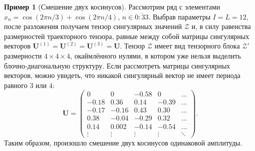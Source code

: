 \documentclass[specialist,
    substylefile = spbu_report.rtx,
    subf,href,colorlinks=true, 12pt]{disser}
\theoremstyle{plain}
\theoremstyle{definition}
\newtheorem{example}{Пример}[section]
\theoremstyle{remark}
\begin{document}
    \begin{example}[Смешение двух косинусов]
        Рассмотрим ряд с элементами $x_n=\cos(2\pi n/3) + \cos(2\pi n/4)$, $n\in\overline{0:33}$.
        Выбрав параметры $I=L=12$, после разложения получаем тензор сингулярных значений $\mathcal{Z}$ и, в силу равенства размерностей
        траекторного тензора, равные между собой матрицы сингулярных векторов $\mathbf{U}^{(1)}=\mathbf{U}^{(2)}=\mathbf{U}^{(3)}=\mathbf{U}$.
        Тензор $\mathcal{Z}$ имеет вид тензорного блока $\mathcal{Z}'$ размерности $4\times 4\times 4$, окаймлённого нулями, в
        котором уже нельзя выделить блочно-диагональную структуру.
        Если рассмотреть матрицы сингулярных векторов, можно увидеть, что никакой сингулярный вектор не имеет периода равного $3$ или $4$:
        \[
            \mathbf{U}=
            \begin{pmatrix}
                0      & 0      & -0.58  & 0      & \ldots \\
                -0.18  & 0.36   & 0.14   & -0.39  & \ldots \\
                -0.17  & -0.16  & 0.43   & 0.30   & \ldots \\
                0.38   & -0.04  & -0.29  & 0.32   & \ldots \\
                0.14   & 0.002  & -0.14  & -0.54  & \ldots \\
                \vdots & \vdots & \vdots & \vdots & \ddots
            \end{pmatrix}.
        \]
        Таким образом, произошло смешение двух косинусов одинаковой амплитуды.
    \end{example}

\end{document}
